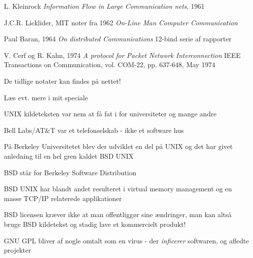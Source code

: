 \documentclass[Screen16to9,17pt]{foils}
\begin{document}

\begin{list1}
\item L. Kleinrock \emph{Information Flow in Large Communication nets}, 1961
\item J.C.R. Licklider, MIT noter fra 1962 \emph{On-Line Man Computer
  Communication}
\item Paul Baran, 1964 \emph{On distributed Communications}
12-bind serie af rapporter\\
\item V. Cerf og R. Kahn, 1974
\emph{A protocol for Packet Network Interconnection}
IEEE Transactions on Communication, vol. COM-22, pp. 637-648, May 1974
\item De tidlige notater kan findes på nettet!
\end{list1}

Læs evt. mere i mit speciale 



\begin{list1}
  \item UNIX kildeteksten var nem at få fat i for universiteter og
  mange andre
\item Bell Labs/AT\&T var et telefonselskab - ikke et software hus
\item På Berkeley Universitetet blev der udviklet en del på UNIX og
  det har givet anledning til en hel gren kaldet BSD UNIX
\item BSD står for Berkeley Software Distribution
\item BSD UNIX har blandt andet resulteret i virtual memory management
  og en masse TCP/IP relaterede applikationer
\end{list1}


\begin{list1}
 \item BSD licensen kræver ikke at man offentliggør sine ændringer,
 man kan altså bruge BSD kildetekst og stadig lave et kommercielt
 produkt!
\item GNU GPL bliver af nogle omtalt som en virus - der
  \emph{inficerer} softwaren, og afledte projekter
\end{list1}
\end{document}
